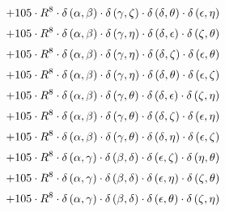 \begin{subequations}
\begin{gather}
 \\[0.2em] \notag 		 + 105 \cdot R^{8} \cdot \delta{}\left(\alpha{}, \beta{}\right) \cdot \delta{}\left(\gamma{}, \zeta{}\right) \cdot \delta{}\left(\delta{}, \theta{}\right) \cdot \delta{}\left(\epsilon{}, \eta{}\right) 
 \\[0.2em] \notag 		 + 105 \cdot R^{8} \cdot \delta{}\left(\alpha{}, \beta{}\right) \cdot \delta{}\left(\gamma{}, \eta{}\right) \cdot \delta{}\left(\delta{}, \epsilon{}\right) \cdot \delta{}\left(\zeta{}, \theta{}\right) 
 \\[0.2em] \notag 		 + 105 \cdot R^{8} \cdot \delta{}\left(\alpha{}, \beta{}\right) \cdot \delta{}\left(\gamma{}, \eta{}\right) \cdot \delta{}\left(\delta{}, \zeta{}\right) \cdot \delta{}\left(\epsilon{}, \theta{}\right) 
 \\[0.2em] \notag 		 + 105 \cdot R^{8} \cdot \delta{}\left(\alpha{}, \beta{}\right) \cdot \delta{}\left(\gamma{}, \eta{}\right) \cdot \delta{}\left(\delta{}, \theta{}\right) \cdot \delta{}\left(\epsilon{}, \zeta{}\right) 
 \\[0.2em] \notag 		 + 105 \cdot R^{8} \cdot \delta{}\left(\alpha{}, \beta{}\right) \cdot \delta{}\left(\gamma{}, \theta{}\right) \cdot \delta{}\left(\delta{}, \epsilon{}\right) \cdot \delta{}\left(\zeta{}, \eta{}\right) 
 \\[0.2em] \notag 		 + 105 \cdot R^{8} \cdot \delta{}\left(\alpha{}, \beta{}\right) \cdot \delta{}\left(\gamma{}, \theta{}\right) \cdot \delta{}\left(\delta{}, \zeta{}\right) \cdot \delta{}\left(\epsilon{}, \eta{}\right) 
 \\[0.2em] \notag 		 + 105 \cdot R^{8} \cdot \delta{}\left(\alpha{}, \beta{}\right) \cdot \delta{}\left(\gamma{}, \theta{}\right) \cdot \delta{}\left(\delta{}, \eta{}\right) \cdot \delta{}\left(\epsilon{}, \zeta{}\right) 
 \\[0.2em] \notag 		 + 105 \cdot R^{8} \cdot \delta{}\left(\alpha{}, \gamma{}\right) \cdot \delta{}\left(\beta{}, \delta{}\right) \cdot \delta{}\left(\epsilon{}, \zeta{}\right) \cdot \delta{}\left(\eta{}, \theta{}\right) 
 \\[0.2em] \notag 		 + 105 \cdot R^{8} \cdot \delta{}\left(\alpha{}, \gamma{}\right) \cdot \delta{}\left(\beta{}, \delta{}\right) \cdot \delta{}\left(\epsilon{}, \eta{}\right) \cdot \delta{}\left(\zeta{}, \theta{}\right) 
 \\[0.2em] \notag 		 + 105 \cdot R^{8} \cdot \delta{}\left(\alpha{}, \gamma{}\right) \cdot \delta{}\left(\beta{}, \delta{}\right) \cdot \delta{}\left(\epsilon{}, \theta{}\right) \cdot \delta{}\left(\zeta{}, \eta{}\right) 

\end{gather}
\end{subequations}
